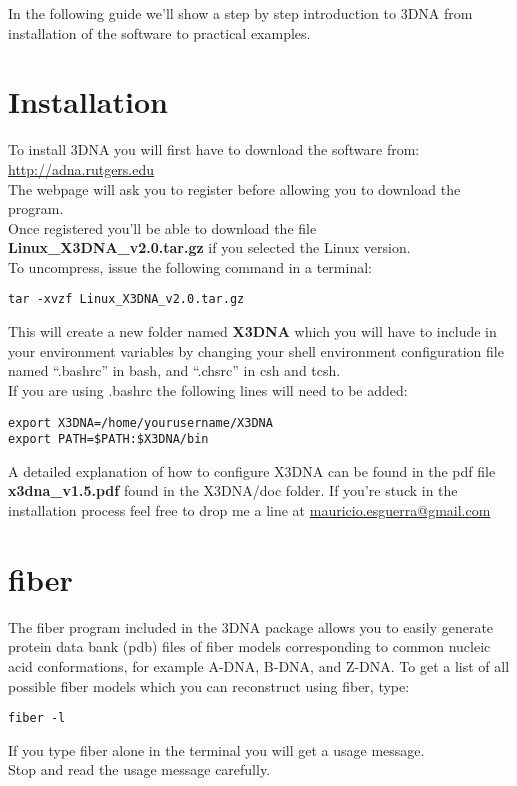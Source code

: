 \maketitle

\label{basics}
In the following guide we'll show  a step by step introduction to 3DNA
from installation of the software to practical examples.

\section{Installation}
To install 3DNA you will first have to download the software from:\\

\url{http://adna.rutgers.edu}\\

\noindent The webpage will ask you to register before allowing you to
download the program.\\
Once   registered    you'll   be    able   to   download    the   file
\textbf{Linux\_X3DNA\_v2.0.tar.gz} if you  selected the Linux version.\\
To uncompress, issue the following command in a terminal:
\begin{Verbatim}
tar -xvzf Linux_X3DNA_v2.0.tar.gz
\end{Verbatim}
This will create a new folder named \textbf{X3DNA} which you will have
to  include  in your  environment  variables  by  changing your  shell
environment  configuration   file  named  ``.bashrc''   in  bash,  and
``.chsrc'' in csh and tcsh.\\ 
If you are using .bashrc the following lines will need to be added:
\begin{Verbatim}
export X3DNA=/home/yourusername/X3DNA
export PATH=$PATH:$X3DNA/bin
\end{Verbatim}
A detailed explanation  of how to configure X3DNA can  be found in the
pdf file  \textbf{x3dna\_v1.5.pdf} found  in the X3DNA/doc  folder. If
you're stuck in the installation process feel free to drop me a line at
\url{mauricio.esguerra@gmail.com}

\section{fiber}
The \textrm{fiber} program included in  the 3DNA package allows you to
easily  generate  protein  data  bank  (pdb)  files  of  fiber  models
corresponding to common nucleic acid conformations, for example A-DNA,
B-DNA, and  Z-DNA.  To get a  list of all possible  fiber models which
you can reconstruct using \textrm{fiber}, type:
\begin{Verbatim}
fiber -l
\end{Verbatim}
If you type \textrm{fiber} alone in the terminal you will get a usage
message.\\
Stop and read the usage message carefully.\\

